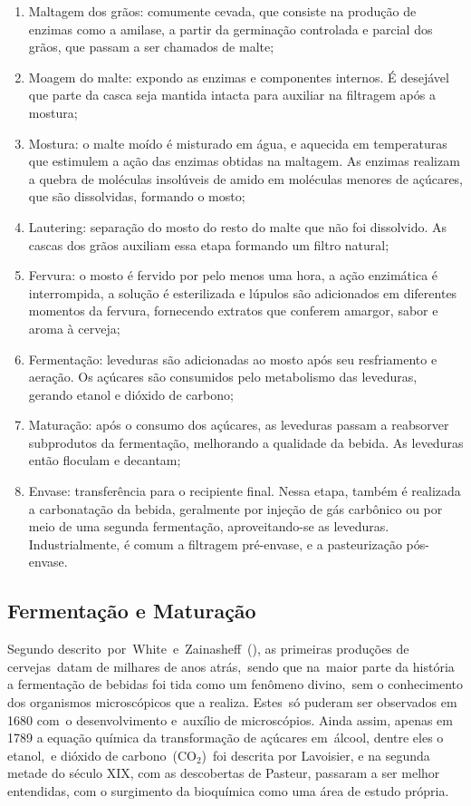 \begin{enumerate}
    \item Maltagem dos grãos: comumente cevada, que consiste na produção de
enzimas como a amilase, a partir da germinação controlada e parcial dos
grãos, que passam a ser chamados de malte;
    \item Moagem do malte: expondo as enzimas e componentes internos. É desejável
que parte da casca seja mantida intacta para auxiliar na filtragem após a
mostura;
    \item Mostura: o malte moído é misturado em água, e aquecida em temperaturas
que estimulem a ação das enzimas obtidas na maltagem. As enzimas
realizam a quebra de moléculas insolúveis de amido em moléculas menores
de açúcares, que são dissolvidas, formando o mosto;
    \item Lautering: separação do mosto do resto do malte que não foi dissolvido. As
cascas dos grãos auxiliam essa etapa formando um filtro natural;
    \item Fervura: o mosto é fervido por pelo menos uma hora, a ação enzimática é
interrompida, a solução é esterilizada e lúpulos são adicionados em diferentes
momentos da fervura, fornecendo extratos que conferem amargor, sabor e
aroma à cerveja;
    \item Fermentação: leveduras são adicionadas ao mosto após seu resfriamento e
aeração. Os açúcares são consumidos pelo metabolismo das leveduras,
gerando etanol e dióxido de carbono;
    \item Maturação: após o consumo dos açúcares, as leveduras passam a reabsorver
subprodutos da fermentação, melhorando a qualidade da bebida. As
leveduras então floculam e decantam;
    \item Envase: transferência para o recipiente final. Nessa etapa, também é
realizada a carbonatação da bebida, geralmente por injeção de gás carbônico
ou por meio de uma segunda fermentação, aproveitando-se as leveduras.
Industrialmente, é comum a filtragem pré-envase, e a pasteurização pós-
envase.
\end{enumerate}

\subsection{Fermentação e Maturação}

Segundo descrito por White e Zainasheff (), as primeiras produções de
cervejas datam de milhares de anos atrás, sendo que na maior parte da história a
fermentação de bebidas foi tida como um fenômeno divino, sem o conhecimento dos
organismos microscópicos que a realiza. Estes só puderam ser observados em 1680
com o desenvolvimento e auxílio de microscópios. Ainda assim, apenas em 1789 a
equação química da transformação de açúcares em álcool, dentre eles o etanol, e
dióxido de carbono ($\mathrm{CO_2}$) foi descrita por Lavoisier, e na segunda metade do século
XIX, com as descobertas de Pasteur, passaram a ser melhor entendidas, com o
surgimento da bioquímica como uma área de estudo própria. 


